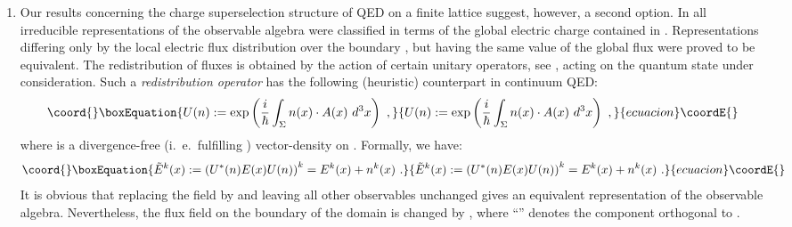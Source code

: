 \documentclass[a4paper,12pt]{article}
\begin{document}
\begin{enumerate}
\item
Our results concerning the charge superselection structure of QED
on a finite lattice \cite{KRT} suggest, however, a second option.
In \cite{KRT} all irreducible representations of the observable
algebra were classified in terms of the global electric charge
\coordHE{} contained in \myHighlight{$\Lambda$}\coordHE{}. Representations differing only
by the local electric flux distribution over the boundary
\myHighlight{$\partial \Lambda$}\coordHE{}, but having the same value of the global flux
\myHighlight{$\Phi_{\partial \Lambda}$}\coordHE{} were proved to be equivalent. The
redistribution of fluxes is obtained by the action of certain
unitary operators, see \cite{KRT}, acting on the quantum state
under consideration. Such a {\em redistribution operator} has the
following (heuristic) counterpart in continuum QED:
\begin{equation}\coord{}\boxEquation{\label{U-continuum}
  U(n) := \exp \left(\frac{i}{\hbar} \int_{\Sigma} n(x)
  \cdot A(x) \  d^3 x \right) \ ,
}{U(n) := \exp \left(\frac{i}{\hbar} \int_{\Sigma} n(x)
  \cdot A(x) \  d^3 x \right) \ ,
}{ecuacion}\coordE{}\end{equation}
where \coordHE{} is a divergence-free (i.~e.~fulfilling
\coordHE{}) vector-density on \coordHE{}. Formally, we have:
\begin{equation}\coord{}\boxEquation{\label{E-continuum}
  {\tilde E}^k(x) :=  \left( U^*(n) E(x) U(n) \right)^k =
  E^k (x) + n^k (x) \ .
}{{\tilde E}^k(x) :=  \left( U^*(n) E(x) U(n) \right)^k =
  E^k (x) + n^k (x) \ .
}{ecuacion}\coordE{}\end{equation}
It is obvious that replacing the field \coordHE{} by \coordHE{} and
leaving all other observables unchanged gives an equivalent
representation of the observable algebra. Nevertheless, the flux
field on the boundary \myHighlight{$\partial \Sigma$}\coordHE{} of the domain \myHighlight{$\Sigma$}\coordHE{} is
changed by \coordHE{}, where ``\myHighlight{$\perp$}\coordHE{}'' denotes the component
orthogonal to \myHighlight{$\partial \Sigma$}\coordHE{}.


\end{enumerate}
\end{document}
